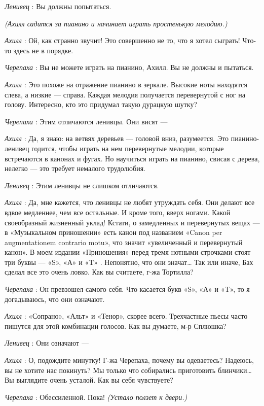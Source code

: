 \documentclass[../main.tex]{subfiles}
\begin{document}
\begin{dialogue}
\emph{Ленивец} : Вы должны попытаться.

\emph{(Ахилл садится за пианино и начинает играть простенькую мелодию.)}

\emph{Ахилл} : Ой, как странно звучит! Это совершенно не то, что я хотел сыграть! Что-то здесь не в порядке.

\emph{Черепаха} : Вы не можете играть на пианино, Ахилл. Вы не должны и пытаться.

\emph{Ахилл} : Это похоже на отражение пианино в зеркале. Высокие ноты находятся слева, а низкие --- справа. Каждая мелодия получается перевернутой с ног на голову. Интересно, кто это придумал такую дурацкую шутку?

\emph{Черепаха} : Этим отличаются ленивцы. Они висят ---

\emph{Ахилл} : Да, я знаю: на ветвях деревьев --- головой вниз, разумеется. Это пианино-ленивец годится, чтобы играть на нем перевернутые мелодии, которые встречаются в канонах и фугах. Но научиться играть на пианино, свисая с дерева, нелегко --- это требует немалого трудолюбия.

\emph{Ленивец} : Этим ленивцы не слишком отличаются.

\emph{Ахилл} : Да, мне кажется, что ленивцы не любят утруждать себя. Они делают все вдвое медленнее, чем все остальные. И кроме того, вверх ногами. Какой своеобразный жизненный уклад! Кстати, о замедленных и перевернутых вещах --- в «Музыкальном приношении» есть канон под названием «Canon per augmentationem contrario motu», что значит «увеличенный и перевернутый канон». В моем издании «Приношения» перед тремя нотными строчками стоят три буквы --- «S», «А» и «T» . Непонятно, что они значат\ldots{} Так или иначе, Бах сделал все это очень ловко. Как вы считаете, г-жа Тортилла?

\emph{Черепаха} : Он превзошел самого себя. Что касается букв «S», «А» и «T», то я догадываюсь, что они означают.

\emph{Ахилл} : «Сопрано», «Альт» и «Тенор», скорее всего. Трехчастные пьесы часто пишутся для этой комбинации голосов. Как вы думаете, м-р Сплюшка?

\emph{Ленивец} : Они означают ---

\emph{Ахилл} : О, подождите минутку! Г-жа Черепаха, почему вы одеваетесь? Надеюсь, вы не хотите нас покинуть? Мы только что собирались приготовить блинчики\ldots{} Вы выглядите очень усталой. Как вы себя чувствуете?

\emph{Черепаха} : Обессиленной. Пока! \emph{(Устало ползет к двери.)}


\end{dialogue}
\end{document}
